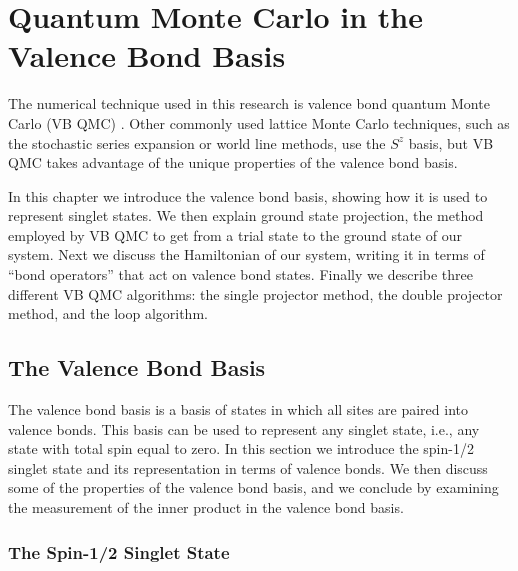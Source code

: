 
\chapter{Quantum Monte Carlo in the Valence Bond Basis}
The numerical technique used in this research is valence bond quantum Monte Carlo (VB QMC) \cite{Sandvik_vbqmc,Sandvik2007}.
Other commonly used lattice Monte Carlo techniques, such as the stochastic series expansion\cite{Sylji2002} or world line \cite{Evertz2003} methods, use the $S^z$ basis, but VB QMC takes advantage of the unique properties of the valence bond basis.  

In this chapter we introduce the valence bond basis, showing how it is used to represent singlet states.  
We then explain ground state projection, the method employed by VB QMC to get from a trial state to the ground state of our system.
Next we discuss the Hamiltonian of our system, writing it in terms of ``bond operators'' that act on valence bond states.
Finally we describe three different VB QMC algorithms: the single projector method, the double projector method, and the loop algorithm.

\section{The Valence Bond Basis} \label{sec:basis}
The valence bond basis is a basis of states in which all sites are paired into valence bonds.  
This basis can be used to represent any singlet state, i.e., any state with total spin equal to zero.
In this section we introduce the spin-1/2 singlet state and its representation in terms of valence bonds.
We then discuss some of the properties of the valence bond basis,
and we conclude by examining the measurement of the inner product in the valence bond basis.
\subsection{The Spin-1/2 Singlet State}

